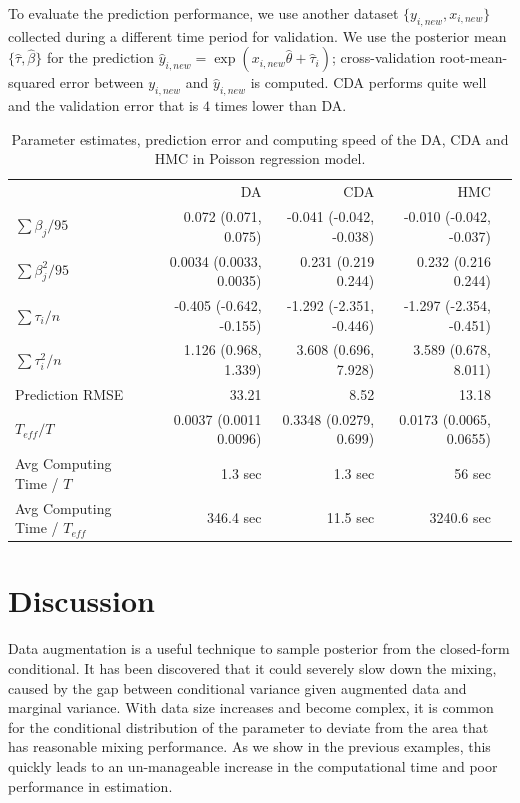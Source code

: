 \documentclass[10pt]{article}
\begin{document}
To evaluate the prediction performance, we use another dataset $\{y_{i,new},x_{i,new} \}$ collected during a different time period for validation. We use the posterior mean $\{\hat\tau, \hat \beta\}$ for the prediction $\hat y_{i,new}=\exp( x_{i,new}{\hat\theta} + \hat\tau_i)$; cross-validation root-mean-squared error between $y_{i,new}$ and $\hat y_{i,new}$ is computed. CDA performs quite well and the validation error that is $4$ times lower than DA.


\begin{table}[H]
\centering
\begin{tabular}{|l |r |r| r| r |} 
 \hline
                          & DA & CDA & HMC\\
 [0.5ex]
$\sum \beta_j / 95$         & 0.072 (0.071, 0.075)&  -0.041 (-0.042, -0.038)  & -0.010 (-0.042, -0.037) \\
$\sum \beta_j^2 / 95$         & 0.0034 (0.0033, 0.0035)&  0.231 (0.219 0.244)  & 0.232 (0.216 0.244)   \\
$\sum\tau_i/n$         & -0.405 (-0.642, -0.155)&  -1.292 (-2.351, -0.446)  &  -1.297 (-2.354, -0.451)  \\
$\sum\tau_i^2/n$         & 1.126 (0.968, 1.339)&  3.608 (0.696, 7.928)  & 3.589 (0.678, 8.011)  \\
Prediction RMSE                           & 33.21        & 8.52          & 13.18\\
$T_{eff} / T$ & 0.0037 (0.0011 0.0096) & 0.3348 (0.0279, 0.699) &  0.0173 (0.0065, 0.0655) \\
Avg Computing Time /  $T$  & 1.3 sec       & 1.3 sec        & 56 sec\\
Avg Computing Time /  $T_{eff}$  & 346.4 sec       & 11.5 sec        & 3240.6 sec\\
 \hline
\end{tabular}
\caption{Parameter estimates, prediction error and computing speed of the DA, CDA and HMC in Poisson regression model.}
\label{table:Poisson}
\end{table}

\section{Discussion}
Data augmentation is a useful technique to sample posterior from the closed-form conditional. It has been discovered that it could severely slow down the mixing, caused by the gap between conditional variance given augmented data and marginal variance. With data size increases and become complex, it is common for the conditional distribution of the parameter to deviate from the area that has reasonable mixing performance. As we show in the previous examples, this quickly leads to an un-manageable increase in the computational time and poor performance in estimation.
\end{document}
